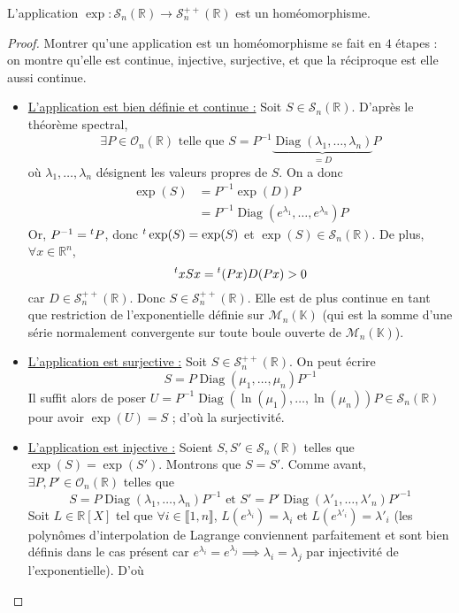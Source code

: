   \begin{theorem}
    L'application $\exp : \mathcal{S}_n(\mathbb{R}) \rightarrow \mathcal{S}^{++}_n(\mathbb{R})$ est un homéomorphisme.
  \end{theorem}

  \begin{proof}
    Montrer qu'une application est un homéomorphisme se fait en $4$ étapes : on montre qu'elle est continue, injective, surjective, et que la réciproque est elle aussi continue.
    \begin{itemize}
      \item \uline{L'application est bien définie et continue :} Soit $S \in \mathcal{S}_n(\mathbb{R})$. D'après le théorème spectral,
      \[ \exists P \in \mathcal{O}_n(\mathbb{R}) \text{ telle que } S = P^{-1} \underbrace{\operatorname{Diag}(\lambda_1, \dots, \lambda_n)}_{= D}P \]
      où $\lambda_1, \dots, \lambda_n$ désignent les valeurs propres de $S$. On a donc
      \begin{align*}
        \exp(S) &= P^{-1} \exp(D) P \\
        &= P^{-1} \operatorname{Diag}(e^{\lambda_1}, \dots, e^{\lambda_n}) P
      \end{align*}
      Or, $P^{-1} = \mathstrut ^t P$, donc $\mathstrut ^t \exp(S) = \exp(S)$ et $\exp(S) \in \mathcal{S}_n(\mathbb{R})$. De plus, $\forall x \in \mathbb{R}^n$,
      \[ \mathstrut ^t x S x = \mathstrut ^t (Px) D (Px) > 0 \]
      car $D \in \mathcal{S}^{++}_n(\mathbb{R})$. Donc $S \in \mathcal{S}^{++}_n(\mathbb{R})$. Elle est de plus continue en tant que restriction de l'exponentielle définie sur $\mathcal{M}_n(\mathbb{K})$ (qui est la somme d'une série normalement convergente sur toute boule ouverte de $\mathcal{M}_n(\mathbb{K})$).
      \item \uline{L'application est surjective :} Soit $S \in \mathcal{S}^{++}_n(\mathbb{R})$. On peut écrire
      \[ S = P \operatorname{Diag}(\mu_1, \dots, \mu_n) P^{-1} \]
      Il suffit alors de poser $U = P^{-1} \operatorname{Diag}(\ln(\mu_1), \dots, \ln(\mu_n)) P \in \mathcal{S}_n(\mathbb{R})$ pour avoir $\exp(U) = S$ ; d'où la surjectivité.
      \item \uline{L'application est injective :} Soient $S, S' \in \mathcal{S}_n(\mathbb{R})$ telles que $\exp(S) = \exp(S')$. Montrons que $S = S'$. Comme avant, $\exists P, P' \in \mathcal{O}_n(\mathbb{R})$ telles que
      \[ S = P \operatorname{Diag}(\lambda_1, \dots, \lambda_n) P^{-1} \text{ et } S' = P' \operatorname{Diag}(\lambda'_1, \dots, \lambda'_n) P'^{-1} \]
      Soit $L \in \mathbb{R}[X]$ tel que $\forall i \in \llbracket 1, n \rrbracket$, $L(e^{\lambda_i}) = \lambda_i$ et $L(e^{\lambda'_i}) = \lambda'_i$ (les polynômes d'interpolation de Lagrange conviennent parfaitement et sont bien définis dans le cas présent car $e^{\lambda_i} = e^{\lambda_j} \implies \lambda_i = \lambda_j$ par injectivité de l'exponentielle). D'où

\end{itemize}
\end{proof}
